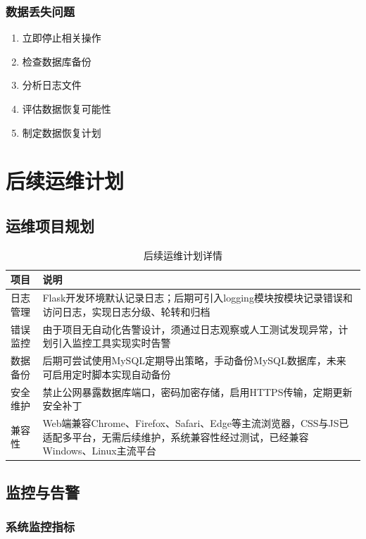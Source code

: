 \documentclass[a4paper]{article}
\begin{document}
\subsubsection{数据丢失问题}

\begin{enumerate}
    \item 立即停止相关操作
    \item 检查数据库备份
    \item 分析日志文件
    \item 评估数据恢复可能性
    \item 制定数据恢复计划
\end{enumerate}

\section{后续运维计划}

\subsection{运维项目规划}

\begin{table}[H]
\centering
\caption{后续运维计划详情}
\begin{tabular}{|p{3cm}|p{12cm}|}
\hline
\textbf{项目} & \textbf{说明} \\
\hline
日志管理 & Flask开发环境默认记录日志；后期可引入logging模块按模块记录错误和访问日志，实现日志分级、轮转和归档 \\
\hline
错误监控 & 由于项目无自动化告警设计，须通过日志观察或人工测试发现异常，计划引入监控工具实现实时告警 \\
\hline
数据备份 & 后期可尝试使用MySQL定期导出策略，手动备份MySQL数据库，未来可启用定时脚本实现自动备份 \\
\hline
安全维护 & 禁止公网暴露数据库端口，密码加密存储，启用HTTPS传输，定期更新安全补丁 \\
\hline
兼容性 & Web端兼容Chrome、Firefox、Safari、Edge等主流浏览器，CSS与JS已适配多平台，无需后续维护，系统兼容性经过测试，已经兼容Windows、Linux主流平台 \\
\hline
\end{tabular}
\end{table}

\subsection{监控与告警}

\subsubsection{系统监控指标}
\end{document}
